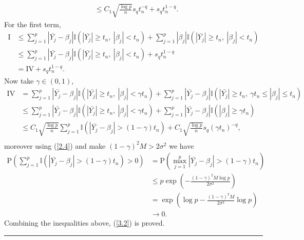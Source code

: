 \documentclass[12pt]{article}
\numberwithin{equation}{section}
\newenvironment{proof}{{\bf Proof:}}{\hfill\rule{2mm}{2mm}}
\begin{document}
\begin{proof}
\begin{align*}
	&\leq C_1\sqrt{\frac{\log p}{n}}s_qt_n^{-q}+s_qt_n^{1-q}.
	\end{align*}
	For the first term,
	\begin{align*}
	\mathrm{I}&\leq \sum_{j=1}^p\left|\bar{Y_j}-\beta_{j}\right|\mathbb{I}\left(|\bar{Y_j}|\geq t_n,\ |\beta_{j}|< t_n\right)+\sum_{j=1}^p\left|\beta_{j}\right|\mathbb{I}\left(|\bar{Y_j}|\geq t_n,\ |\beta_{j}|< t_n\right)\\
	&\leq \sum_{j=1}^p\left|\bar{Y_j}-\beta_{j}\right|\mathbb{I}\left(|\bar{Y_j}|\geq t_n,\ |\beta_{j}|< t_n\right)+s_qt_n^{1-q}\\
	&=\mathrm{IV}+s_qt_n^{1-q}.
	\end{align*}
	Now take $\gamma\in (0,1)$,
	\begin{align*}
	\mathrm{IV}&=\sum_{j=1}^p\left|\bar{Y_j}-\beta_{j}\right|\mathbb{I}\left(|\bar{Y_j}|\geq t_n,\ |\beta_{j}|< \gamma t_n\right)+\sum_{j=1}^p\left|\bar{Y_j}-\beta_{j}\right|\mathbb{I}\left(|\bar{Y_j}|\geq t_n,\ \gamma t_n\leq |\beta_{j}|\leq t_n\right)\\
	&\leq \sum_{j=1}^p\left|\bar{Y_j}-\beta_{j}\right|\mathbb{I}\left(|\bar{Y_j}|\geq t_n,\ |\beta_{j}|< \gamma t_n\right)+\sum_{j=1}^p\left|\bar{Y_j}-\beta_{j}\right|\mathbb{I}\left(|\beta_{j}|\geq \gamma t_n\right)\\
	&\leq C_1\sqrt{\frac{\log p}{n}}\sum_{j=1}^p\mathbb{I}\left(\left|\bar{Y_j}-\beta_{j}\right|>(1-\gamma)t_n\right)+C_1\sqrt{\frac{\log p}{n}}s_q(\gamma t_n)^{-q},\\
	\end{align*}
	moreover using (\ref{2.4}) and make $(1-\gamma)^2M>2\sigma^2$ we have
	\begin{align*}
	\mathrm{P}\left(\sum_{j=1}^p\mathbb{I}\left(\left|\bar{Y_j}-\beta_{j}\right|>(1-\gamma)t_n\right)>0\right)&=\mathrm{P}\left(\max_{j=1}^p|\bar{Y_j}-\beta_{j}|>(1-\gamma)t_n\right)\\
	&\leq p\exp\left(-\frac{(1-\gamma)^2M\log p}{2\sigma^2}\right)\\
	&=\exp\left(\log p-\frac{(1-\gamma)^2M}{2\sigma^2}\log p\right)\\
	&\to 0.
	\end{align*}
	Combining the inequalities above, (\ref{3.2}) is proved.
\end{proof}

\end{document}
